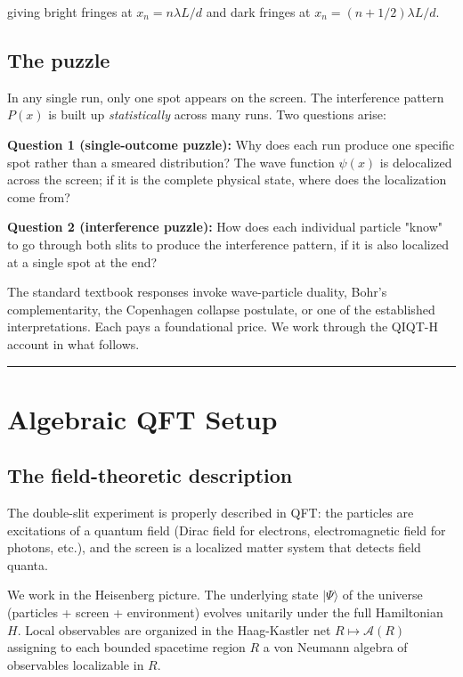 \documentclass[11pt,a4paper]{article}
\begin{document}
giving bright fringes at $x_n = n\lambda L/d$ and dark fringes at $x_n = (n+1/2)\lambda L/d$.

\subsection{The puzzle}

In any single run, only one spot appears on the screen. The interference pattern $P(x)$ is built up \emph{statistically} across many runs. Two questions arise:

\textbf{Question 1 (single-outcome puzzle):} Why does each run produce one specific spot rather than a smeared distribution? The wave function $\psi(x)$ is delocalized across the screen; if it is the complete physical state, where does the localization come from?

\textbf{Question 2 (interference puzzle):} How does each individual particle "know" to go through both slits to produce the interference pattern, if it is also localized at a single spot at the end?

The standard textbook responses invoke wave-particle duality, Bohr's complementarity, the Copenhagen collapse postulate, or one of the established interpretations. Each pays a foundational price. We work through the QIQT-H account in what follows.

\medskip\hrule\medskip

\section{Algebraic QFT Setup}

\subsection{The field-theoretic description}

The double-slit experiment is properly described in QFT: the particles are excitations of a quantum field (Dirac field for electrons, electromagnetic field for photons, etc.), and the screen is a localized matter system that detects field quanta.

We work in the Heisenberg picture. The underlying state $|\Psi\rangle$ of the universe (particles + screen + environment) evolves unitarily under the full Hamiltonian $H$. Local observables are organized in the Haag-Kastler net $R \mapsto \mathcal{A}(R)$ assigning to each bounded spacetime region $R$ a von Neumann algebra of observables localizable in $R$.
\end{document}
